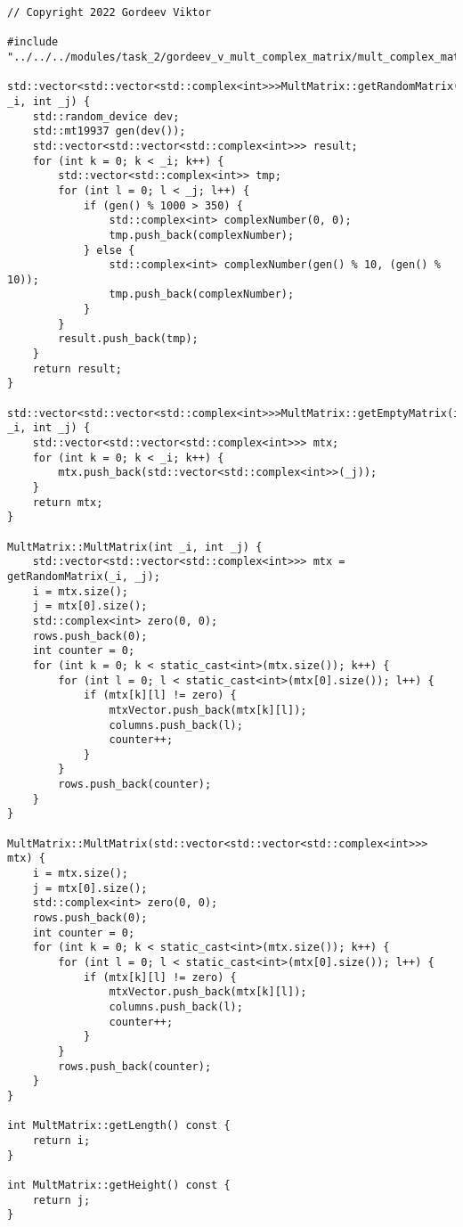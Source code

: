 \documentclass{report}
\begin{document}
\begin{lstlisting}
// Copyright 2022 Gordeev Viktor

#include "../../../modules/task_2/gordeev_v_mult_complex_matrix/mult_complex_matrix.h"

std::vector<std::vector<std::complex<int>>>MultMatrix::getRandomMatrix(int _i, int _j) {
    std::random_device dev;
    std::mt19937 gen(dev());
    std::vector<std::vector<std::complex<int>>> result;
    for (int k = 0; k < _i; k++) {
        std::vector<std::complex<int>> tmp;
        for (int l = 0; l < _j; l++) {
            if (gen() % 1000 > 350) {
                std::complex<int> complexNumber(0, 0);
                tmp.push_back(complexNumber);
            } else {
                std::complex<int> complexNumber(gen() % 10, (gen() % 10));
                tmp.push_back(complexNumber);
            }
        }
        result.push_back(tmp);
    }
    return result;
}

std::vector<std::vector<std::complex<int>>>MultMatrix::getEmptyMatrix(int _i, int _j) {
    std::vector<std::vector<std::complex<int>>> mtx;
    for (int k = 0; k < _i; k++) {
        mtx.push_back(std::vector<std::complex<int>>(_j));
    }
    return mtx;
}

MultMatrix::MultMatrix(int _i, int _j) {
    std::vector<std::vector<std::complex<int>>> mtx = getRandomMatrix(_i, _j);
    i = mtx.size();
    j = mtx[0].size();
    std::complex<int> zero(0, 0);
    rows.push_back(0);
    int counter = 0;
    for (int k = 0; k < static_cast<int>(mtx.size()); k++) {
        for (int l = 0; l < static_cast<int>(mtx[0].size()); l++) {
            if (mtx[k][l] != zero) {
                mtxVector.push_back(mtx[k][l]);
                columns.push_back(l);
                counter++;
            }
        }
        rows.push_back(counter);
    }
}

MultMatrix::MultMatrix(std::vector<std::vector<std::complex<int>>> mtx) {
    i = mtx.size();
    j = mtx[0].size();
    std::complex<int> zero(0, 0);
    rows.push_back(0);
    int counter = 0;
    for (int k = 0; k < static_cast<int>(mtx.size()); k++) {
        for (int l = 0; l < static_cast<int>(mtx[0].size()); l++) {
            if (mtx[k][l] != zero) {
                mtxVector.push_back(mtx[k][l]);
                columns.push_back(l);
                counter++;
            }
        }
        rows.push_back(counter);
    }
}

int MultMatrix::getLength() const {
    return i;
}

int MultMatrix::getHeight() const {
    return j;
}


\end{lstlisting}
\end{document}
